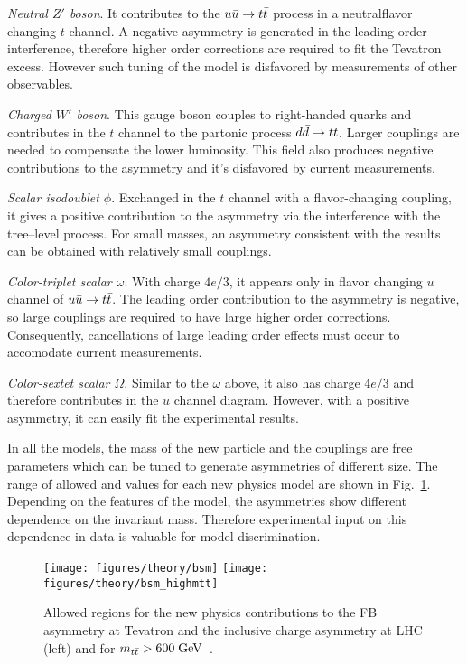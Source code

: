 {\em Neutral $Z'$ boson}. It contributes to the $\mbox{$u\bar{u}$}{}\to\mbox{$t\bar{t}$}{}$
process in a neutralflavor changing $t$ channel. A negative asymmetry
is generated in the leading order interference, therefore higher order
corrections are required to fit the Tevatron excess. However such
tuning of the model is disfavored by measurements of other observables.

{\em Charged $W'$ boson}. This gauge boson couples to right-handed
quarks and contributes in the $t$ channel to the partonic process
$\mbox{$d\bar{d}$}{}\to\mbox{$t\bar{t}$}{}$. Larger couplings are needed to compensate the
lower \ddbar{} luminosity. This field also produces negative
contributions to the asymmetry and it's disfavored by current measurements.

{\em Scalar isodoublet $\phi$}.
Exchanged in the $t$ channel with a flavor-changing coupling, it gives
a positive contribution to the asymmetry via the interference with the
tree--level process. For small masses, an asymmetry consistent with the
\afb{} results can be obtained with relatively small couplings.

{\em Color-triplet scalar $\omega$}.
With charge $4e/3$, it appears only in flavor changing $u$ channel of
$\mbox{$u\bar{u}$}{}\to\mbox{$t\bar{t}$}{}$. The leading order contribution to the asymmetry
is negative, so large couplings are required to have large higher
order corrections. Consequently, cancellations of large leading order
effects must occur to accomodate current measurements.

{\em Color-sextet scalar $\Omega$}.
Similar to the $\omega$ above, it also has charge $4e/3$ and therefore
contributes in the $u$ channel diagram. However, with a positive
asymmetry, it can easily fit the experimental results.

In all the models, the mass of the new particle and the couplings are
free parameters which can be tuned to generate asymmetries of
different size. The range of allowed \ac{} and \afb{} values for each
new physics model are shown in Fig.~\ref{fig:bsmmodels}. Depending on
the features of the model, the asymmetries show different dependence
on the \ttbar{} invariant mass. Therefore experimental input on this
dependence in data is valuable for model discrimination. 

\begin{figure}[!htb]
  \centering
  \texttt{[image: figures/theory/bsm]} 
  \texttt{[image: figures/theory/bsm\_highmtt]} 
  \caption{Allowed regions for the new physics contributions to the FB
    asymmetry at Tevatron and the inclusive charge asymmetry at LHC
    (left) and for $\mbox{$m_{t\bar{t}}$}{}>600 \; \mathrm{GeV}$~\cite{AguilarSaavedra:2011hz}.}
  \label{fig:bsmmodels}
\end{figure}


